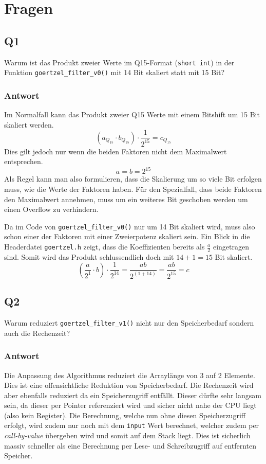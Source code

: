 \section{Fragen}

\subsection{Q1}

Warum ist das Produkt zweier Werte im Q15-Format (\lstinline{short int}) in
der Funktion \lstinline{goertzel_filter_v0()} mit 14 Bit skaliert statt mit
15 Bit?

\subsubsection*{Antwort}
Im Normalfall kann das Produkt zweier Q15 Werte mit einem Bitshift um 15 Bit
skaliert werden.
\[ 
	( a_{Q_{15}} \cdot b_{Q_{15}}) \cdot \frac{1}{2^{15}} = c_{Q_{15}}
\]
Dies gilt jedoch nur wenn die beiden Faktoren nicht dem Maximalwert
entsprechen.
\[
	a = b = 2^{15}
\]
Als Regel kann man also formulieren, dass die Skalierung um so viele Bit
erfolgen muss, wie die Werte der Faktoren haben. Für den Spezialfall, dass
beide Faktoren den Maximalwert annehmen, muss um ein weiteres Bit geschoben
werden um einen Overflow zu verhindern.

Da im Code von \lstinline{goertzel_filter_v0()} nur um 14 Bit skaliert wird,
muss also schon einer der Faktoren mit einer Zweierpotenz skaliert sein.
Ein Blick in die Headerdatei \lstinline{goertzel.h} zeigt, dass die
Koeffizienten bereits als $\frac{a}{2}$ eingetragen sind. Somit wird das
Produkt schlussendlich doch mit $14+1=15$ Bit skaliert.
\[
	\left( \frac{a}{2^1} \cdot b \right) \cdot \frac{1}{2^{14}}
	= \frac{a b}{2^{(1+14)}}
	= \frac{a b}{2^{15}}
	= c
\]

\subsection{Q2}

Warum reduziert \lstinline{goertzel_filter_v1()} nicht nur den Speicherbedarf
sondern auch die Rechenzeit?

\subsubsection*{Antwort}
Die Anpassung des Algorithmus reduziert die Arraylänge von 3 auf 2 Elemente.
Dies ist eine offensichtliche Reduktion von Speicherbedarf. Die Rechenzeit
wird aber ebenfalls reduziert da ein Speicherzugriff entfällt. Dieser dürfte
sehr langsam sein, da dieser per Pointer referenziert wird und sicher nicht
nahe der CPU liegt (also kein Register). Die Berechnung, welche nun ohne
diesen Speicherzugriff erfolgt, wird zudem nur noch mit dem \lstinline{input}
Wert berechnet, welcher zudem per \emph{call-by-value} übergeben wird und
somit auf dem Stack liegt. Dies ist sicherlich massiv schneller als eine
Berechnung per Lese- und Schreibzugriff auf entfernten Speicher.

